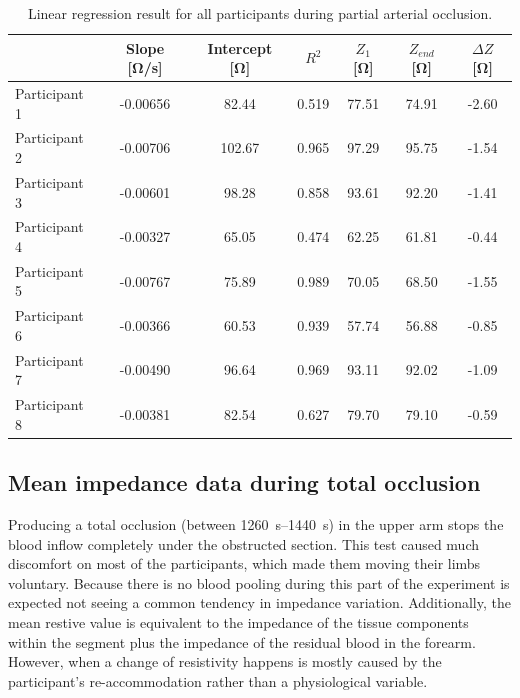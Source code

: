 \begin{table}[htbp]
	\caption{Linear regression result for all participants during partial arterial occlusion.}
	\label{tbl:arterial_occlusion:region4}
	\centering
	\begin{tabu}{lcccccc}
		\toprule
		& \textbf{Slope [\si{\ohm/\second}]} & \textbf{Intercept [\si{\ohm}]} & \textbf{$R^2$} & \textbf{$Z_1$ [\si{\ohm}]} & \textbf{$Z_{end}$ [\si{\ohm}]} & \textbf{ $\Delta Z$ [\si{\ohm}]} \\ \midrule
		Participant 1  &  -0.00656  &   82.44    &   0.519  &  77.51  &  74.91  &  -2.60 \\
		Participant 2  &  -0.00706  &  102.67    &   0.965  &  97.29  &  95.75  &  -1.54 \\
		Participant 3  &  -0.00601  &   98.28    &   0.858  &  93.61  &  92.20  &  -1.41 \\
		Participant 4  &  -0.00327  &   65.05    &   0.474  &  62.25  &  61.81  &  -0.44\\
		Participant 5  &  -0.00767  &   75.89    &   0.989  &  70.05  &  68.50  &  -1.55\\
		Participant 6  &  -0.00366  &   60.53    &   0.939  &  57.74  &  56.88  &  -0.85\\
		Participant 7  &  -0.00490  &   96.64    &   0.969  &  93.11  &  92.02  &  -1.09\\
		Participant 8  &  -0.00381  &   82.54    &   0.627  &  79.70  &  79.10  &  -0.59\\ \bottomrule
	\end{tabu} 
\end{table}



\subsection{Mean impedance data during total occlusion}
\label{section5.2.4}
Producing a total occlusion (between \SIrange{1260}{1440}{\second}) in the upper arm stops the blood inflow completely under the obstructed section. This test caused much discomfort on most of the participants, which made them moving their limbs voluntary. Because there is no blood pooling during this part of the experiment is expected not seeing a common tendency in impedance variation. Additionally, the mean restive value is equivalent to the impedance of the tissue components within the segment plus the impedance of the residual blood in the forearm. However, when a change of resistivity happens is mostly caused by the participant's re-accommodation rather than a physiological variable. 

